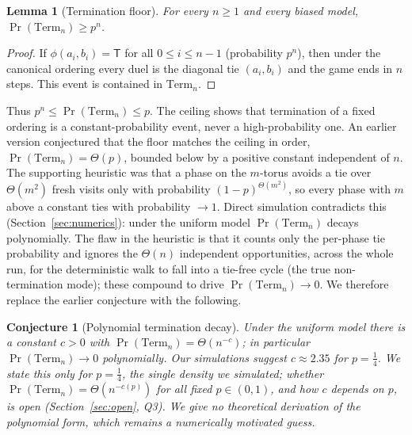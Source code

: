 \documentclass[11pt]{article}
\newtheorem{lemma}{Lemma}
\newtheorem{conjecture}{Conjecture}
\theoremstyle{definition}
\theoremstyle{remark}
\newcommand{\TT}{\mathsf{T}}
\newcommand{\Term}{\mathrm{Term}}
\begin{document}
\begin{lemma}[Termination floor]\label{lem:floor}
For every $n \ge 1$ and every biased model, $\Pr(\Term_n) \ge p^n$.
\end{lemma}
\begin{proof}
If $\phi(a_i, b_i) = \TT$ for all $0 \le i \le n - 1$ (probability $p^n$), then under the canonical ordering every duel is
the diagonal tie $(a_i, b_i)$ and the game ends in $n$ steps. This event is contained in $\Term_n$.
\end{proof}

Thus $p^n \le \Pr(\Term_n) \le p$. The ceiling shows that termination of a fixed ordering is a constant-probability event,
never a high-probability one. An earlier version conjectured that the floor matches the ceiling in order,
$\Pr(\Term_n) = \Theta(p)$, bounded below by a positive constant independent of $n$. The supporting heuristic was that a
phase on the $m$-torus avoids a tie over $\Theta(m^2)$ fresh visits only with probability $(1 - p)^{\Theta(m^2)}$, so every
phase with $m$ above a constant ties with probability $\to 1$. Direct simulation contradicts this (Section~\ref{sec:numerics}):
under the uniform model $\Pr(\Term_n)$ decays polynomially. The flaw in the heuristic is that it counts only the per-phase
tie probability and ignores the $\Theta(n)$ independent opportunities, across the whole run, for the deterministic walk to
fall into a tie-free cycle (the true non-termination mode); these compound to drive $\Pr(\Term_n) \to 0$. We therefore
replace the earlier conjecture with the following.

\begin{conjecture}[Polynomial termination decay]\label{conj:poly}
Under the uniform model there is a constant $c > 0$ with $\Pr(\Term_n) = \Theta(n^{-c})$; in particular
$\Pr(\Term_n) \to 0$ polynomially. Our simulations suggest $c \approx 2.35$ for $p = \tfrac14$. We state this only for
$p = \tfrac14$, the single density we simulated; whether $\Pr(\Term_n) = \Theta(n^{-c(p)})$ for all fixed $p \in (0, 1)$,
and how $c$ depends on $p$, is open (Section~\ref{sec:open}, Q3). We give no theoretical derivation of the polynomial form,
which remains a numerically motivated guess.
\end{conjecture}
\end{document}
